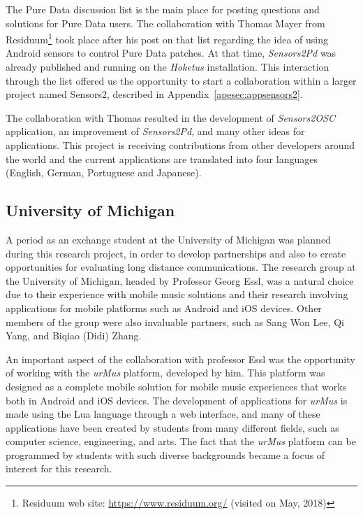 The Pure Data discussion list is the main place for posting questions and solutions for Pure Data users.
The collaboration with Thomas Mayer from Residuum\footnote{Residuum web site: \url{https://www.residuum.org/} (visited on May, 2018)} took place after his post on that list regarding the idea of using Android sensors to control Pure Data patches.
At that time, \textit{Sensors2Pd} was already published and running on the \textit{Hoketus} installation.
This interaction through the list offered us the opportunity to start a collaboration within a larger project named Sensors2, described in Appendix~\ref{apesec:appsensors2}.

The collaboration with Thomas resulted in the development of \textit{Sensors2OSC} application, an improvement of \textit{Sensors2Pd}, and many other ideas for applications.
This project is receiving contributions from other developers around the world and the current applications are translated into four languages (English, German, Portuguese and Japanese).

\subsection*{University of Michigan}

A period as an exchange student at the University of Michigan was planned during this research project, in order to develop partnerships and also to create opportunities for evaluating long distance communications.
The research group at the University of Michigan, headed by Professor Georg Essl, was a natural choice due to their experience with mobile music solutions and their research involving applications for mobile platforms such as Android and iOS devices.
Other members of the group were also invaluable partners, such as Sang Won Lee, Qi Yang, and Biqiao (Didi) Zhang.

An important aspect of the collaboration with professor Essl was the opportunity of working with the \textit{urMus} platform, developed by him.
This platform was designed as a complete mobile solution for mobile music experiences that works both in Android and iOS devices.
The development of applications for \textit{urMus} is made using the Lua language through a web interface, and many of these applications have been created by students from many different fields, such as computer science, engineering, and arts. The fact that the \textit{urMus} platform can be programmed by students with such diverse backgrounds became a focus of interest for this research. 


